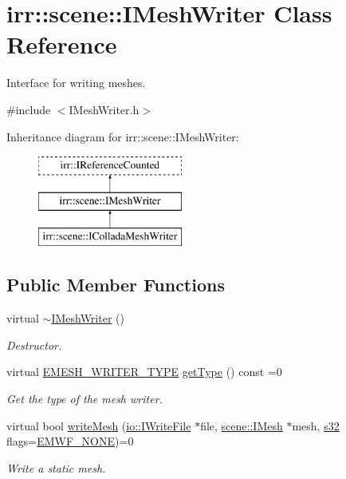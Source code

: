 \hypertarget{classirr_1_1scene_1_1IMeshWriter}{}\section{irr\+:\+:scene\+:\+:I\+Mesh\+Writer Class Reference}
\label{classirr_1_1scene_1_1IMeshWriter}


Interface for writing meshes.  




{\ttfamily \#include $<$I\+Mesh\+Writer.\+h$>$}

Inheritance diagram for irr\+:\+:scene\+:\+:I\+Mesh\+Writer\+:\begin{figure}[H]
\begin{center}
\leavevmode
\includegraphics[height=3.000000cm]{classirr_1_1scene_1_1IMeshWriter}
\end{center}
\end{figure}
\subsection*{Public Member Functions}
\begin{DoxyCompactItemize}
\item 
\mbox{\label{classirr_1_1scene_1_1IMeshWriter_a9f92ba59b4ea9a21ccc6bcddc0d3ada9}} 
virtual \hyperlink{classirr_1_1scene_1_1IMeshWriter_a9f92ba59b4ea9a21ccc6bcddc0d3ada9}{$\sim$\+I\+Mesh\+Writer} ()
\begin{DoxyCompactList}\small\item\em Destructor. \end{DoxyCompactList}\item 
virtual \hyperlink{namespaceirr_1_1scene_a431fa15741518ba15f6d5f2608b6cb4e}{E\+M\+E\+S\+H\+\_\+\+W\+R\+I\+T\+E\+R\+\_\+\+T\+Y\+PE} \hyperlink{classirr_1_1scene_1_1IMeshWriter_af70d702a86e25074f96e93a2d5a15813}{get\+Type} () const =0
\begin{DoxyCompactList}\small\item\em Get the type of the mesh writer. \end{DoxyCompactList}\item 
virtual bool \hyperlink{classirr_1_1scene_1_1IMeshWriter_a8cc31e211dc94104c7dd4b0ce4fd2cca}{write\+Mesh} (\hyperlink{classirr_1_1io_1_1IWriteFile}{io\+::\+I\+Write\+File} $\ast$file, \hyperlink{classirr_1_1scene_1_1IMesh}{scene\+::\+I\+Mesh} $\ast$mesh, \hyperlink{namespaceirr_ac66849b7a6ed16e30ebede579f9b47c6}{s32} flags=\hyperlink{namespaceirr_1_1scene_a9faae6cd9e415a0553cb4cdc190bbc1daf2dfebddfd0a2cd2b558e23cb6a87464}{E\+M\+W\+F\+\_\+\+N\+O\+NE})=0
\begin{DoxyCompactList}\small\item\em Write a static mesh. \end{DoxyCompactList}\end{DoxyCompactItemize}
